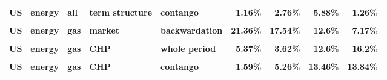 \documentclass[
  authoryear,
  preprint,
  3p]{elsarticle}
\begin{document}
\begin{landscape}
\begin{longtable}[t]{>{}l>{}l>{}l>{}l>{}l>{}r>{}r>{}r>{}r}
\textbf{US} & \textbf{energy} & \textbf{all} & \textbf{term structure} & \textbf{contango} & \textcolor[HTML]{4285f4}{\textbf{1.16\%}} & \textcolor[HTML]{4285f4}{\textbf{2.76\%}} & \textcolor[HTML]{4285f4}{\textbf{5.88\%}} & \textcolor[HTML]{4285f4}{\textbf{1.26\%}}\\
\textbf{\cellcolor{gray!10}{US}} & \textbf{\cellcolor{gray!10}{energy}} & \textbf{\cellcolor{gray!10}{gas}} & \textbf{\cellcolor{gray!10}{market}} & \textbf{\cellcolor{gray!10}{whole period}} & \textcolor[HTML]{4285f4}{\textbf{\cellcolor{gray!10}{19.37\%}}} & \textcolor[HTML]{4285f4}{\textbf{\cellcolor{gray!10}{18.38\%}}} & \textcolor[HTML]{4285f4}{\textbf{\cellcolor{gray!10}{10.88\%}}} & \textcolor[HTML]{4285f4}{\textbf{\cellcolor{gray!10}{7.86\%}}}\\
\addlinespace
\textbf{US} & \textbf{energy} & \textbf{gas} & \textbf{market} & \textbf{backwardation} & \textcolor[HTML]{4285f4}{\textbf{21.36\%}} & \textcolor[HTML]{4285f4}{\textbf{17.54\%}} & \textcolor[HTML]{4285f4}{\textbf{12.6\%}} & \textcolor[HTML]{4285f4}{\textbf{7.17\%}}\\
\textbf{\cellcolor{gray!10}{US}} & \textbf{\cellcolor{gray!10}{energy}} & \textbf{\cellcolor{gray!10}{gas}} & \textbf{\cellcolor{gray!10}{market}} & \textbf{\cellcolor{gray!10}{contango}} & \textcolor[HTML]{4285f4}{\textbf{\cellcolor{gray!10}{17.12\%}}} & \textcolor[HTML]{4285f4}{\textbf{\cellcolor{gray!10}{20.07\%}}} & \textcolor[HTML]{4285f4}{\textbf{\cellcolor{gray!10}{9.92\%}}} & \textcolor[HTML]{4285f4}{\textbf{\cellcolor{gray!10}{7.96\%}}}\\
\textbf{US} & \textbf{energy} & \textbf{gas} & \textbf{CHP} & \textbf{whole period} & \textcolor[HTML]{4285f4}{\textbf{5.37\%}} & \textcolor[HTML]{4285f4}{\textbf{3.62\%}} & \textcolor[HTML]{4285f4}{\textbf{12.6\%}} & \textcolor[HTML]{4285f4}{\textbf{16.2\%}}\\
\textbf{\cellcolor{gray!10}{US}} & \textbf{\cellcolor{gray!10}{energy}} & \textbf{\cellcolor{gray!10}{gas}} & \textbf{\cellcolor{gray!10}{CHP}} & \textbf{\cellcolor{gray!10}{backwardation}} & \textcolor[HTML]{4285f4}{\textbf{\cellcolor{gray!10}{10.16\%}}} & \textcolor[HTML]{4285f4}{\textbf{\cellcolor{gray!10}{2.14\%}}} & \textcolor[HTML]{4285f4}{\textbf{\cellcolor{gray!10}{11.42\%}}} & \textcolor[HTML]{4285f4}{\textbf{\cellcolor{gray!10}{19.3\%}}}\\
\textbf{US} & \textbf{energy} & \textbf{gas} & \textbf{CHP} & \textbf{contango} & \textcolor[HTML]{4285f4}{\textbf{1.59\%}} & \textcolor[HTML]{4285f4}{\textbf{5.26\%}} & \textcolor[HTML]{4285f4}{\textbf{13.46\%}} & \textcolor[HTML]{4285f4}{\textbf{13.84\%}}\\

\end{longtable}
\end{landscape}
\end{document}
